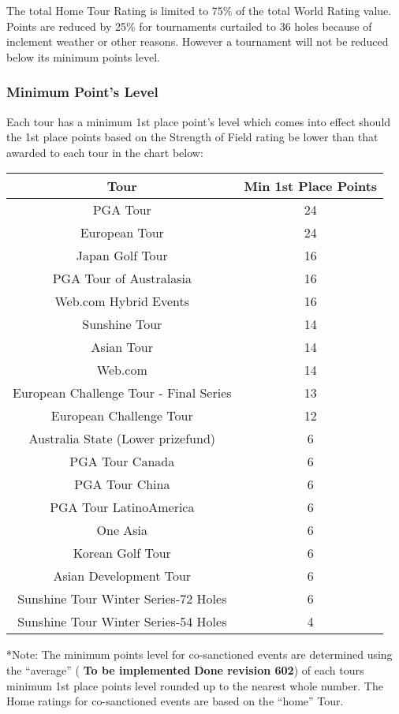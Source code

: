 \documentclass{article}
\begin{document}
The total Home Tour Rating is limited to 75\% of the total World Rating value. \\
Points are reduced by 25\% for tournaments curtailed to 36 holes because of inclement weather or other reasons. However a tournament will not be reduced below its minimum points level.

\subsubsection{Minimum Point’s Level}

Each tour has a minimum 1st place point’s level which comes into effect should the 1st place points based on the Strength of Field rating be lower than that awarded to each tour in the chart below:

\begin{center}
\begin{tabular}{ | c | c | }
\hline

Tour &	Min 1st Place Points\\
\hline
PGA Tour	&24\\
European Tour	&24\\
Japan Golf Tour&	16\\
PGA Tour of Australasia&	16\\
 Web.com Hybrid Events	&16\\
Sunshine Tour	&14\\
Asian Tour	&14\\
Web.com	&14\\
European Challenge Tour - Final Series	&13 \\
European Challenge Tour	&12\\
Australia State (Lower prizefund)&	6\\
PGA Tour Canada	&6\\
PGA Tour China	&6\\
PGA Tour LatinoAmerica&	6\\
One Asia	&6\\
Korean Golf Tour&	6\\
Asian Development Tour&	6\\
Sunshine Tour Winter Series-72 Holes&	6\\
Sunshine Tour Winter Series-54 Holes	&4\\
\hline
\end{tabular}
\end{center}

*Note: The minimum points level for co-sanctioned events are determined using the “average” (
\textbf{\color{orange} To be implemented} \textbf{Done revision 602}) of each tours minimum 1st place points level rounded up to the nearest whole number. The Home ratings for co-sanctioned events are based on the “home” Tour.
\end{document}

